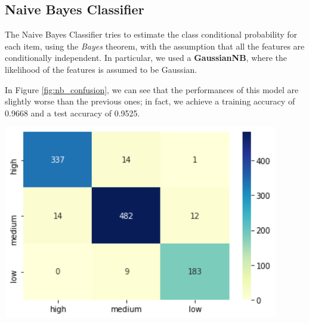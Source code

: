 \subsection{Naive Bayes Classifier}
\begin{minipage}{0.59\textwidth}
\vspace{-13mm}
The Naive Bayes Classifier tries to estimate the class conditional probability for each item, using the \emph{Bayes} theorem, with the assumption that all the features are conditionally independent. In particular, we used a \textbf{GaussianNB}, where the likelihood of the features is assumed to be Gaussian.

In Figure \ref{fig:nb_confusion}, we can see that the performances of this model are slightly worse than the previous ones; in fact, we achieve a training accuracy of 0.9668 and a test accuracy of 0.9525.  
\end{minipage}
\begin{minipage}{0.4\textwidth}
\centering
\includegraphics[width=0.90\textwidth]{img/nb_confusion.png}
\captionsetup{justification=centering}
\label{fig:nb_confusion}
\end{minipage}

